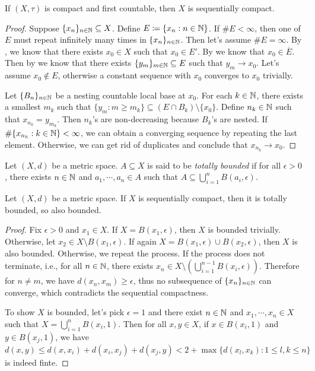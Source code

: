 \documentclass[screen]{techreport}
\numberwithin{equation}{section}
\begin{document}
\begin{proposition}\label{Prop:CompactFstCountThenSeqCompact}
	If $(X,\tau)$ is compact and first countable, then $X$ is sequentially compact.
\end{proposition}
\begin{proof}
	Suppose $\{x_n\}_{n \in \mathbb{N}} \subseteq X$.
	Define $E \coloneqq \{ x_n : n \in \mathbb{N} \}$.
	If $\#E < \infty$, then one of $E$ must repeat infinitely many times in $\{x_n\}_{n \in \mathbb{N}}$.
	Then let's assume $\#E = \infty$.
	By , we know that there exists $x_0 \in X$ such that $x_0 \in E'$.
	By  we know that $x_0 \in \overline{E}$.
	Then by  we know that there exists $\{y_m\}_{m \in \mathbb{N}} \subseteq E$ such that $y_m \rightarrow x_0$.
	Let's assume $x_0 \not\in E$, otherwise a constant sequence with $x_0$ converges to $x_0$ trivially.
	
	Let $\{B_n\}_{n \in \mathbb{N}}$ be a nesting countable local base at $x_0$.
	For each $k \in \mathbb{N}$, there exists a smallest $m_k$ such that $\{ y_m : m \ge m_k\} \subseteq (E \cap B_k) \setminus \{x_0\}$.
	Define $n_k \in \mathbb{N}$ such that $x_{n_k} = y_{m_k}$.
	Then $n_k$'s are non-decreasing because $B_k$'s are nested.
	If $\#\{ x_{n_k} : k \in \mathbb{N} \} < \infty$, we can obtain a converging sequence by repeating the last element.
	Otherwise, we can get rid of duplicates and conclude that $x_{n_k} \rightarrow x_0$.
\end{proof}

\begin{definition}\label{De:TotallyBoundedness}
	Let $(X,d)$ be a metric space.
	$A \subseteq X$ is said to be \emph{totally bounded} if for all $\epsilon > 0$, there exists $n 	\in \mathbb{N}$ and $a_1,\cdots,a_n \in A$ such that $A \subseteq \bigcup_{i=1}^n B(a_i,\epsilon)$.
\end{definition}

\begin{lemma}\label{Lem:MetricSeqCompactIsTotallyBounded}
	Let $(X,d)$ be a metric space.
	If $X$ is sequentially compact, then it is totally bounded, so also bounded.
\end{lemma}
\begin{proof}
	Fix $\epsilon > 0$ and $x_1 \in X$.
	If $X = B(x_1,\epsilon)$, then $X$ is bounded trivially.
	Otherwise, let $x_2 \in X \setminus B(x_1,\epsilon)$.
	If again $X = B(x_1,\epsilon) \cup B(x_2,\epsilon)$, then $X$ is also bounded.
	Otherwise, we repeat the process.
	If the process does not terminate, i.e., for all $n \in \mathbb{N}$, there exists $x_n \in X \setminus (\bigcup_{i=1}^{n-1} B(x_i,\epsilon))$.
	Therefore for $n \neq m$, we have $d(x_n,x_m) \ge \epsilon$, thus no subsequence of $\{x_n\}_{n \in \mathbb{N}}$ can converge, which contradicts the sequential compactness.
	
	To show $X$ is bounded, let's pick $\epsilon =1$ and there exist $n \in \mathbb{N}$ and $x_1,\cdots,x_n \in X$ such that $X = \bigcup_{i=1}^n B(x_i,1)$.
	Then for all $x,y \in X$, if $x \in B(x_i,1)$ and $y \in B(x_j,1)$, we have
	\[
	d(x,y) \le d(x,x_i) + d(x_i,x_j) + d(x_j,y) < 2 + \max\{ d(x_l,x_k): 1 \le l,k \le n \}
	\]
	is indeed finte.
\end{proof}
\end{document}
